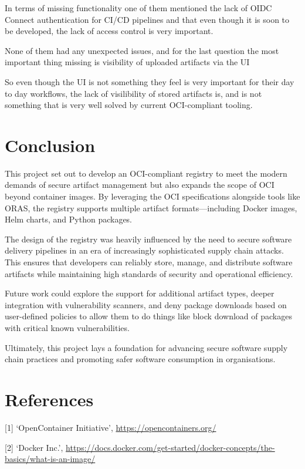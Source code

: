 \documentclass{article}
\begin{document}
  In terms of missing functionality one of them mentioned the lack of OIDC Connect authentication for CI/CD pipelines and that even though it is soon to be developed, the lack of access control is very important.

  None of them had any unexpected issues, and for the last question the most important thing missing is visibility of uploaded artifacts via the UI

  So even though the UI is not something they feel is very important for their day to day workflows, the lack of visilibility of stored artifacts is, and is not something that is very well solved by current OCI-compliant tooling.

  \section{Conclusion}

  This project set out to develop an OCI-compliant registry to meet the modern demands of secure artifact management but also expands the scope of OCI beyond container images. 
  By leveraging the OCI specifications alongside tools like ORAS, the registry supports multiple artifact formats—including Docker images, Helm charts, and Python packages.

  The design of the registry was heavily influenced by the need to secure software delivery pipelines in an era of increasingly sophisticated supply chain attacks. This ensures that developers can reliably store, manage, and distribute software artifacts while maintaining high standards of security and operational efficiency.

  Future work could explore the support for additional artifact types, deeper integration with vulnerability scanners, and deny package downloads based on user-defined policies to allow them to do things like block download of packages with critical known vulnerabilities.
  
  Ultimately, this project lays a foundation for advancing secure software supply chain practices and promoting safer software consumption in organisations.

  \newpage

  \section{References}

  [1] `OpenContainer Initiative', \url{https://opencontainers.org/}
  
  [2] `Docker Inc.', \url{https://docs.docker.com/get-started/docker-concepts/the-basics/what-is-an-image/}
\end{document}
